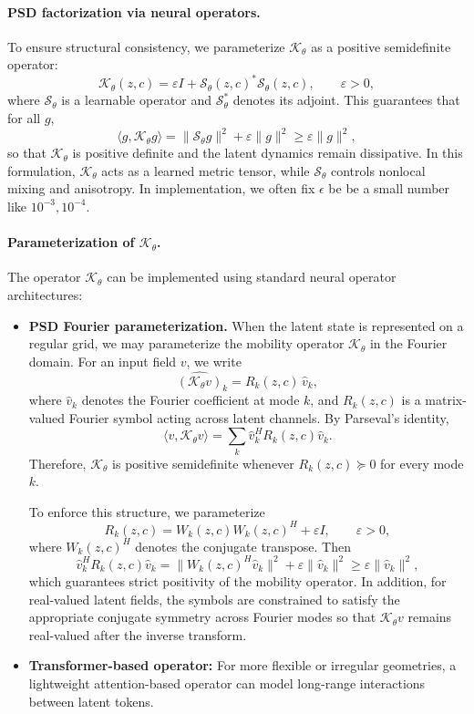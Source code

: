 \documentclass[11pt]{article}
\begin{document}
\paragraph{PSD factorization via neural operators.}
To ensure structural consistency, we parameterize $\mathcal K_\theta$ as a positive semidefinite operator:
\begin{equation}
\mathcal K_\theta(z,c)
=
\varepsilon I + \mathcal S_\theta(z,c)^\ast \mathcal S_\theta(z,c),
\qquad \varepsilon > 0,
\label{eq:K_factorization_full}
\end{equation}
where $\mathcal S_\theta$ is a learnable operator and $\mathcal S_\theta^\ast$ denotes its adjoint. 
This guarantees that for all $g$,
\begin{equation}
\langle g, \mathcal K_\theta g\rangle
=
\|\mathcal S_\theta g\|^2 + \varepsilon \|g\|^2
\ge \varepsilon \|g\|^2,
\end{equation}
so that $\mathcal K_\theta$ is positive definite and the latent dynamics remain dissipative. In this formulation, $\mathcal K_\theta$ acts as a learned metric tensor, while $\mathcal S_\theta$ controls nonlocal mixing and anisotropy. In implementation, we often fix $\epsilon$ be be a small number like $10^{-3},10^{-4}$.

\paragraph{Parameterization of $\mathcal K_\theta$.}
The operator $\mathcal K_\theta$ can be implemented using standard neural operator architectures:
\begin{itemize}[itemsep=-2pt,topsep=2pt]
\item \textbf{PSD Fourier parameterization.}
When the latent state is represented on a regular grid, we may parameterize the mobility operator $\mathcal K_\theta$ in the Fourier domain. For an input field $v$, we write
\[
\widehat{(\mathcal K_\theta v)}_k = R_k(z,c)\,\hat v_k,
\]
where $\hat v_k$ denotes the Fourier coefficient at mode $k$, and $R_k(z,c)$ is a matrix-valued Fourier symbol acting across latent channels. By Parseval's identity,
\[
\langle v,\mathcal K_\theta v\rangle
=
\sum_k \hat v_k^H R_k(z,c)\hat v_k.
\]
Therefore, $\mathcal K_\theta$ is positive semidefinite whenever $R_k(z,c)\succeq 0$ for every mode $k$.

To enforce this structure, we parameterize
\[
R_k(z,c)=W_k(z,c)W_k(z,c)^H+\varepsilon I,
\qquad \varepsilon>0,
\]
where $W_k(z,c)^H$ denotes the conjugate transpose. Then
\[
\hat v_k^H R_k(z,c)\hat v_k
=
\|W_k(z,c)^H\hat v_k\|^2+\varepsilon\|\hat v_k\|^2 \ge \varepsilon\|\hat v_k\|^2,
\]
which guarantees strict positivity of the mobility operator. In addition, for real-valued latent fields, the symbols are constrained to satisfy the appropriate conjugate symmetry across Fourier modes so that $\mathcal K_\theta v$ remains real-valued after the inverse transform.

\item \textbf{Transformer-based operator:} For more flexible or irregular geometries, a lightweight attention-based operator can model long-range interactions between latent tokens.
\end{itemize}
\end{document}
